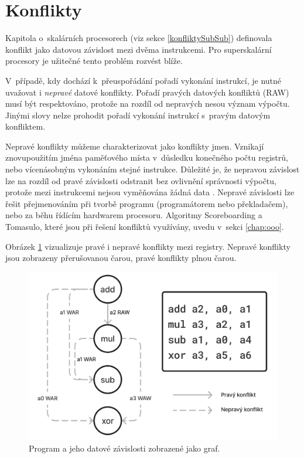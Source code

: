 
\section{Konflikty}
\label{conflicts}

Kapitola o~skalárních procesorech (viz sekce \ref{konfliktySubSub}) definovala konflikt jako datovou závislost mezi dvěma instrukcemi.
Pro superskalární procesory je užitečné tento problém rozvést blíže.

V~případě, kdy dochází k~přeuspořádání pořadí vykonání instrukcí, je nutné uvažovat i \emph{nepravé} datové konflikty.
Pořadí pravých datových konfliktů (RAW) musí být respektováno, protože na rozdíl od nepravých nesou význam výpočtu. Jinými slovy nelze prohodit pořadí vykonání instrukcí s~pravým datovým konfliktem.

Nepravé konflikty můžeme charakterizovat jako konflikty jmen.
Vznikají znovupoužitím jména paměťového místa v~důsledku konečného počtu registrů, nebo vícenásobným vykonáním stejné instrukce.
Důležité je, že nepravou závislost lze na rozdíl od pravé závislosti odstranit bez ovlivnění správnosti výpočtu, protože mezi instrukcemi nejsou vyměňována žádná data \cite{QuantApproach}.
Nepravé závislosti lze řešit přejmenováním při tvorbě programu (programátorem nebo překladačem), nebo za běhu řídícím hardwarem procesoru.
Algoritmy Scoreboarding a Tomasulo, které jsou při řešení konfliktů využívány, uvedu v~sekci \ref{chap:ooo}.

Obrázek \ref{dataconflicts} vizualizuje pravé i nepravé konflikty mezi registry.
Nepravé konflikty jsou zobrazeny přerušovanou čarou, pravé konflikty plnou čarou.

\begin{figure}[ht]\centering
  \centering
  \includegraphics[width=13cm]{obrazky-figures/dataconflicts.png}
  \caption{Program a jeho datové závislosti zobrazené jako graf.}
  \label{dataconflicts}
\end{figure}

